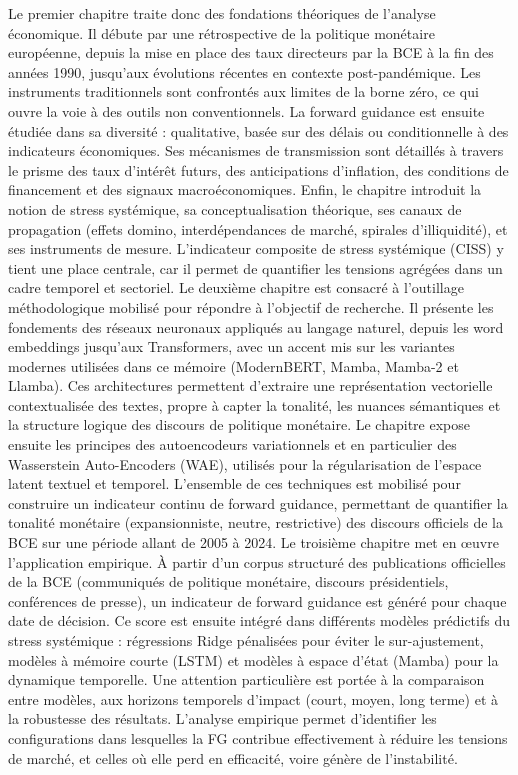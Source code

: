 Le premier chapitre traite donc des fondations théoriques de l’analyse économique. Il débute par une rétrospective de la politique monétaire européenne, depuis la mise en place des taux directeurs par la BCE à la fin des années 1990, jusqu’aux évolutions récentes en contexte post-pandémique. Les instruments traditionnels sont confrontés aux limites de la borne zéro, ce qui ouvre la voie à des outils non conventionnels. La forward guidance est ensuite étudiée dans sa diversité : qualitative, basée sur des délais ou conditionnelle à des indicateurs économiques. Ses mécanismes de transmission sont détaillés à travers le prisme des taux d’intérêt futurs, des anticipations d’inflation, des conditions de financement et des signaux macroéconomiques. Enfin, le chapitre introduit la notion de stress systémique, sa conceptualisation théorique, ses canaux de propagation (effets domino, interdépendances de marché, spirales d’illiquidité), et ses instruments de mesure. L’indicateur composite de stress systémique (CISS) y tient une place centrale, car il permet de quantifier les tensions agrégées dans un cadre temporel et sectoriel.
Le deuxième chapitre est consacré à l’outillage méthodologique mobilisé pour répondre à l’objectif de recherche. Il présente les fondements des réseaux neuronaux appliqués au langage naturel, depuis les word embeddings jusqu’aux Transformers, avec un accent mis sur les variantes modernes utilisées dans ce mémoire (ModernBERT, Mamba, Mamba-2 et Llamba). Ces architectures permettent d’extraire une représentation vectorielle contextualisée des textes, propre à capter la tonalité, les nuances sémantiques et la structure logique des discours de politique monétaire. Le chapitre expose ensuite les principes des autoencodeurs variationnels et en particulier des Wasserstein Auto-Encoders (WAE), utilisés pour la régularisation de l’espace latent textuel et temporel. L’ensemble de ces techniques est mobilisé pour construire un indicateur continu de forward guidance, permettant de quantifier la tonalité monétaire (expansionniste, neutre, restrictive) des discours officiels de la BCE sur une période allant de 2005 à 2024.
Le troisième chapitre met en œuvre l’application empirique. À partir d’un corpus structuré des publications officielles de la BCE (communiqués de politique monétaire, discours présidentiels, conférences de presse), un indicateur de forward guidance est généré pour chaque date de décision. Ce score est ensuite intégré dans différents modèles prédictifs du stress systémique : régressions Ridge pénalisées pour éviter le sur-ajustement, modèles à mémoire courte (LSTM) et modèles à espace d’état (Mamba) pour la dynamique temporelle. Une attention particulière est portée à la comparaison entre modèles, aux horizons temporels d’impact (court, moyen, long terme) et à la robustesse des résultats. L’analyse empirique permet d’identifier les configurations dans lesquelles la FG contribue effectivement à réduire les tensions de marché, et celles où elle perd en efficacité, voire génère de l’instabilité. 
